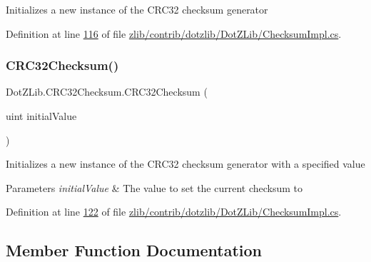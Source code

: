 Initializes a new instance of the C\+R\+C32 checksum generator 



Definition at line \hyperlink{zlib_2contrib_2dotzlib_2_dot_z_lib_2_checksum_impl_8cs_source_l00116}{116} of file \hyperlink{zlib_2contrib_2dotzlib_2_dot_z_lib_2_checksum_impl_8cs_source}{zlib/contrib/dotzlib/\+Dot\+Z\+Lib/\+Checksum\+Impl.\+cs}.

\mbox{\label{class_dot_z_lib_1_1_c_r_c32_checksum_a7032fdb98254bd918ff19b5251c29634}} 
\subsubsection{\texorpdfstring{C\+R\+C32\+Checksum()}{CRC32Checksum()}\hspace{0.1cm}{\footnotesize\ttfamily [4/4]}}
{\footnotesize\ttfamily Dot\+Z\+Lib.\+C\+R\+C32\+Checksum.\+C\+R\+C32\+Checksum (\begin{DoxyParamCaption}\item[{uint}]{initial\+Value }\end{DoxyParamCaption})\hspace{0.3cm}{\ttfamily [inline]}}



Initializes a new instance of the C\+R\+C32 checksum generator with a specified value 


\begin{DoxyParams}{Parameters}
{\em initial\+Value} & The value to set the current checksum to\\
\hline
\end{DoxyParams}


Definition at line \hyperlink{zlib_2contrib_2dotzlib_2_dot_z_lib_2_checksum_impl_8cs_source_l00122}{122} of file \hyperlink{zlib_2contrib_2dotzlib_2_dot_z_lib_2_checksum_impl_8cs_source}{zlib/contrib/dotzlib/\+Dot\+Z\+Lib/\+Checksum\+Impl.\+cs}.



\subsection{Member Function Documentation}
\mbox{\label{class_dot_z_lib_1_1_c_r_c32_checksum_abe29e66033fa164a7c7c0463e6c88074}} 
